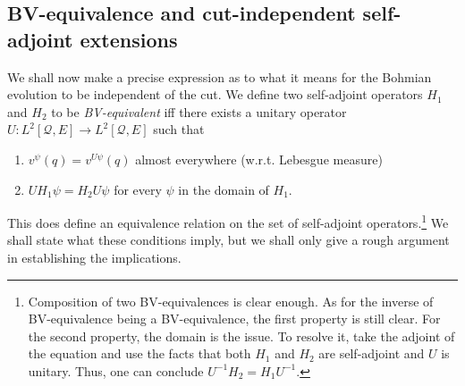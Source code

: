 \documentclass[11pt]{article}
\theoremstyle{remark}
\begin{document}
\subsection{BV-equivalence and cut-independent self-adjoint extensions}


We shall now make a precise expression as to what it means for the
 Bohmian evolution to be independent of the cut. 
We define two self-adjoint operators $H_1$  and $H_2$ to be
\emph{BV-equivalent} iff there exists a unitary operator $U: 
L^2[\ensuremath{\mathcal{Q}},E] \to L^2[\ensuremath{\mathcal{Q}}, E]$ such that 
\begin{enumerate}
\item  $v^{\ensuremath{\psi}} (\ensuremath{q}) 
= v^{U \ensuremath{\psi}} (\ensuremath{q})$ almost everywhere (w.r.t. Lebesgue measure)
\item $U H_1 \ensuremath{\psi} = H_2 U \ensuremath{\psi}$ for every $\ensuremath{\psi}$ in the domain of $H_1$. 
\end{enumerate}
This does define an equivalence relation on the set of self-adjoint
operators.\footnote{Composition of two BV-equivalences is clear
enough.  As for the inverse of BV-equivalence being a BV-equivalence,
the first property is still clear. For the
second property, the domain is the issue. To resolve it, take
 the adjoint of the equation and use the facts
that both $H_1$ and $H_2$ are self-adjoint and $U$ is unitary. Thus,
one can conclude $U^{-1} H_2 = H_1 U^{-1}$.} 
We shall state what these conditions imply, but we shall only give a
rough argument in establishing  the
implications. 
\end{document}
